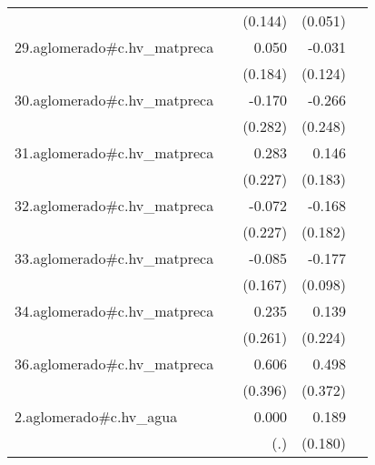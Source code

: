 {\begin{longtable}{l*{4}{D{.}{.}{-1}}}
            &                     &     (0.144)         &     (0.051)         &                     \\
\addlinespace
29.aglomerado#c.hv\_matpreca&                     &       0.050         &      -0.031         &                     \\
            &                     &     (0.184)         &     (0.124)         &                     \\
\addlinespace
30.aglomerado#c.hv\_matpreca&                     &      -0.170         &      -0.266         &                     \\
            &                     &     (0.282)         &     (0.248)         &                     \\
\addlinespace
31.aglomerado#c.hv\_matpreca&                     &       0.283         &       0.146         &                     \\
            &                     &     (0.227)         &     (0.183)         &                     \\
\addlinespace
32.aglomerado#c.hv\_matpreca&                     &      -0.072         &      -0.168         &                     \\
            &                     &     (0.227)         &     (0.182)         &                     \\
\addlinespace
33.aglomerado#c.hv\_matpreca&                     &      -0.085         &      -0.177         &                     \\
            &                     &     (0.167)         &     (0.098)         &                     \\
\addlinespace
34.aglomerado#c.hv\_matpreca&                     &       0.235         &       0.139         &                     \\
            &                     &     (0.261)         &     (0.224)         &                     \\
\addlinespace
36.aglomerado#c.hv\_matpreca&                     &       0.606         &       0.498         &                     \\
            &                     &     (0.396)         &     (0.372)         &                     \\
\addlinespace
2.aglomerado#c.hv\_agua&                     &       0.000         &       0.189         &                     \\
            &                     &         (.)         &     (0.180)         &                     \\

\end{longtable}}
